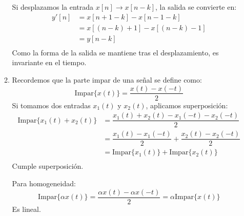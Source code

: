 \begin{enumerate}[label=\color{red}\textbf{\arabic*)}]
\begin{enumerate}[label=\color{red}\textbf{\alph*)}]
            Si desplazamos la entrada $x[n]\to x[n-k]$, la salida se convierte en: \[
           \begin{aligned}
               y'[n]&= x[n+1-k]-x[n-1-k] \\
                    &= x[(n-k)+1]-x[(n-k)-1] \\
                    &= y[n-k] \\
           \end{aligned} 
            \] 
            Como la forma de la salida se mantiene tras el desplazamiento, es invariante en el tiempo.
        \item {} 

            Recordemos que la parte impar de una señal se define como: \[
            \mathrm{Impar}\{x(t)\} =\dfrac{x(t)-x(-t)}{2}
            \] 
            Si tomamos dos entradas $x_1(t)$ y $x_2(t)$, aplicamos superposición: \[
           \begin{aligned}
               \mathrm{Impar}\{x_1(t)+x_2(t)\}&= \dfrac{x_1(t)+x_2(t)-x_1(-t)-x_2(-t)}{2} \\
               &= \dfrac{x_1(t)-x_1(-t)}{2} +\dfrac{x_2(t)-x_2(-t)}{2}\\
               &= \mathrm{Impar}\{x_1(t)\} +\mathrm{Impar}\{x_2(t)\}  \\
           \end{aligned} 
            \] 
            Cumple superposición.

            Para homogeneidad: \[
            \mathrm{Impar}\{\alpha x(t)\} =\dfrac{\alpha x(t)-\alpha x(-t)}{2}=\alpha\mathrm{Impar}\{x(t)\} 
            \] 
            Es lineal.


\end{enumerate}
\end{enumerate}
